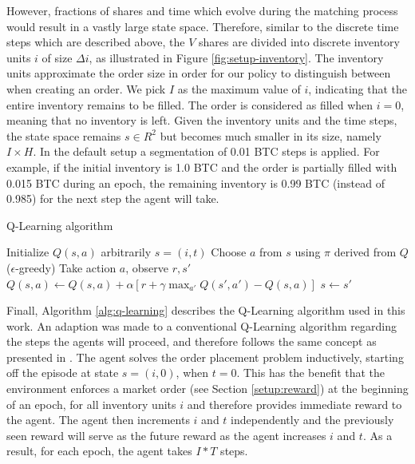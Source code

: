 However, fractions of shares and time which evolve during the matching process would result in a vastly large state space.
Therefore, similar to the discrete time steps which are described above, the $V$ shares are divided into discrete inventory units $i$ of size $\Delta{i}$, as illustrated in Figure \ref{fig:setup-inventory}.
The inventory units approximate the order size in order for our policy to distinguish between when creating an order.
We pick $I$ as the maximum value of $i$, indicating that the entire inventory remains to be filled.
The order is considered as filled when $i=0$, meaning that no inventory is left.
Given the inventory units and the time steps, the state space remains $s \in R^2$ but becomes much smaller in its size, namely $I \times H$.
In the default setup a segmentation of 0.01 BTC steps is applied.
For example, if the initial inventory is 1.0 BTC and the order is partially filled with 0.015 BTC during an epoch, the remaining inventory is 0.99 BTC (instead of 0.985) for the next step the agent will take.

\begin{algorithm}
\caption{Q-Learning algorithm}\label{alg:q-learning}
\begin{algorithmic}[1]
\State Initialize $Q(s,a)$ arbitrarily
\State $s=(i, t)$
\State Choose $a$ from $s$ using $\pi$ derived from $Q$ ($\epsilon$-greedy)
\State Take action $a$, observe $r, s'$
\State $Q(s,a) \gets Q(s,a)+ \alpha[r+ \gamma \max_{a'}Q(s',a')-Q(s,a)]$
\State $s \gets s'$
\EndFor
\EndFor
\EndFor
\end{algorithmic}
\end{algorithm}
Finall, Algorithm \ref{alg:q-learning} describes the Q-Learning algorithm used in this work.
An adaption was made to a conventional Q-Learning algorithm\cite{sutton1998reinforcement} regarding the steps the agents will proceed, and therefore follows the same concept as presented in \cite{nevmyvaka2006reinforcement}.
The agent solves the order placement problem inductively, starting off the episode at state $s=(i,0)$, when $t=0$.
This has the benefit that the environment enforces a market order (see Section \ref{setup:reward}) at the beginning of an epoch, for all inventory units $i$ and therefore provides immediate reward to the agent.
The agent then increments $i$ and $t$ independently and the previously seen reward will serve as the future reward as the agent increases $i$ and $t$.
As a result, for each epoch, the agent takes $I*T$ steps.

